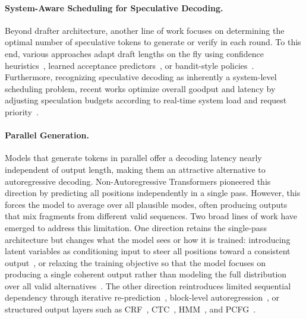 \paragraph{System-Aware Scheduling for Speculative Decoding.}
Beyond drafter architecture, another line of work focuses on determining the optimal number of speculative tokens to generate or verify in each round. To this end, various approaches adapt draft lengths on the fly using confidence heuristics~\citep{mamou2024dynamicspeculationlookaheadaccelerates,li-etal-2024-eagle, du2024glide,liu2026talon,wen2026specboundadaptiveboundedselfspeculation}, learned acceptance predictors~\citep{huang2024specdec++, zacks9172026automtpvllm}, or bandit-style policies~\citep{liu2026notabanditprovablynoregretdrafter}. Furthermore, recognizing speculative decoding as inherently a system-level scheduling problem, recent works optimize overall goodput and latency by adjusting speculation budgets according to real-time system load and request priority~\citep{angelslim2026dcut, liu2024turbospec,10.1145/3772052.3772239,li2026nightjardynamicadaptivespeculative,wu-etal-2025-tetris,hu2026echo,miao2024specinfer,sadhukhan2025magicdecbreakinglatencythroughputtradeoff}.

\paragraph{Parallel Generation.}
Models that generate tokens in parallel offer a decoding latency nearly independent of output length, making them an attractive alternative to autoregressive decoding.
Non-Autoregressive Transformers \citep[NATs,][]{gu2018nonautoregressive} pioneered this direction by predicting all positions independently in a single pass.
However, this forces the model to average over all plausible modes, often producing outputs that mix fragments from different valid sequences. 
Two broad lines of work have emerged to address this limitation.
One direction retains the single-pass architecture but changes what the model sees or how it is trained: introducing latent variables as conditioning input to steer all positions toward a consistent output~\citep{gu2018nonautoregressive,pmlr-v80-kaiser18a,ma-etal-2019-flowseq}, or relaxing the training objective so that the model focuses on producing a single coherent output rather than modeling the full distribution over all valid alternatives~\citep{shao-etal-2021-sequence,pmlr-v139-du21c,qian-etal-2021-glancing,shao2023beyond}.
The other direction reintroduces limited sequential dependency through iterative re-prediction~\citep{ghazvininejad-etal-2019-mask,austin2021structured,li2022diffusionlm}, block-level autoregression~\citep{wang-etal-2018-semi-autoregressive,arriola2025block}, or structured output layers such as CRF~\citep{NEURIPS2019_74563ba2}, CTC~\citep{libovicky-helcl-2018-end,saharia-etal-2020-non}, HMM~\citep{pmlr-v162-huang22m}, and PCFG~\citep{gui2023nonautoregressive}.

